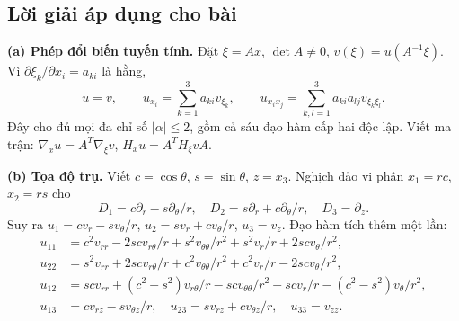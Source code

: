 \documentclass[10pt,a4paper]{article}
\begin{document}
\subsection*{Lời giải áp dụng cho bài}
\textbf{(a) Phép đổi biến tuyến tính.} Đặt $\xi=Ax$, $\det A\ne0$, $v(\xi)=u(A^{-1}\xi)$. Vì $\partial\xi_k/\partial x_i=a_{ki}$ là hằng,
\[u=v,\qquad u_{x_i}=\sum_{k=1}^3a_{ki}v_{\xi_k},\qquad
u_{x_ix_j}=\sum_{k,l=1}^3a_{ki}a_{lj}v_{\xi_k\xi_l}.\]
Đây cho đủ mọi đa chỉ số $|\alpha|\le2$, gồm cả sáu đạo hàm cấp hai độc lập. Viết ma trận: $\nabla_xu=A^T\nabla_\xi v$, $H_xu=A^T H_\xi v A$.

\textbf{(b) Tọa độ trụ.} Viết $c=\cos\theta$, $s=\sin\theta$, $z=x_3$. Nghịch đảo vi phân $x_1=rc$, $x_2=rs$ cho
\[D_1=c\partial_r-s\partial_\theta/r,\quad D_2=s\partial_r+c\partial_\theta/r,\quad D_3=\partial_z.\]
Suy ra $u_1=cv_r-sv_\theta/r$, $u_2=sv_r+cv_\theta/r$, $u_3=v_z$. Đạo hàm tích thêm một lần:
\begin{align*}
u_{11}&=c^2v_{rr}-2scv_{r\theta}/r+s^2v_{\theta\theta}/r^2+s^2v_r/r+2scv_\theta/r^2,\\
u_{22}&=s^2v_{rr}+2scv_{r\theta}/r+c^2v_{\theta\theta}/r^2+c^2v_r/r-2scv_\theta/r^2,\\
u_{12}&=scv_{rr}+(c^2-s^2)v_{r\theta}/r-scv_{\theta\theta}/r^2-scv_r/r-(c^2-s^2)v_\theta/r^2,\\
u_{13}&=cv_{rz}-sv_{\theta z}/r,\quad
u_{23}=sv_{rz}+cv_{\theta z}/r,\quad u_{33}=v_{zz}.
\end{align*}
\end{document}
